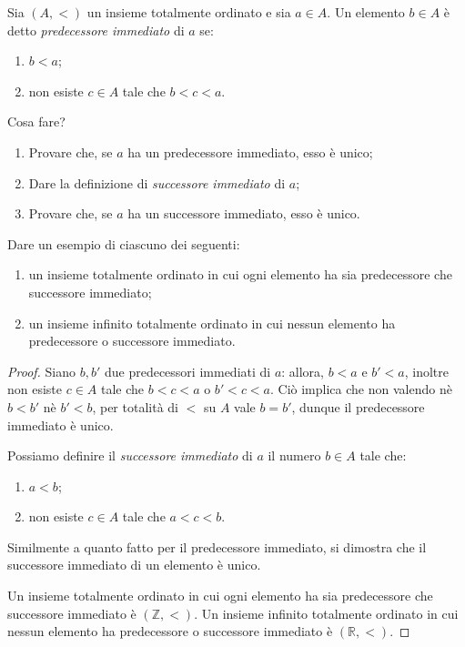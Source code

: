 \begin{exe}
  Sia \((A,<)\) un insieme totalmente ordinato e sia \(a \in A\). Un elemento \(b \in A\) è detto \emph{predecessore immediato} di \(a\) se:
  \begin{enumerate}
    \item \(b < a\);
    \item non esiste \(c \in A\) tale che \(b < c < a\).
  \end{enumerate}
  Cosa fare?
  \begin{enumerate}
    \item Provare che, se \(a\) ha un predecessore immediato, esso è unico;
    \item Dare la definizione di \emph{successore immediato} di \(a\);
    \item Provare che, se \(a\) ha un successore immediato, esso è unico.
  \end{enumerate}
  Dare un esempio di ciascuno dei seguenti:
  \begin{enumerate}
    \item un insieme totalmente ordinato in cui ogni elemento ha sia predecessore che successore immediato;
    \item un insieme infinito totalmente ordinato in cui nessun elemento ha predecessore o successore immediato.
  \end{enumerate}
\end{exe}
\begin{proof}
  Siano \(b,b'\) due predecessori immediati di \(a\): allora, \(b < a\) e \(b' < a\), inoltre non esiste \(c \in A\) tale che \(b < c < a\) o \(b' < c < a\). Ciò implica che non valendo nè \(b < b'\) nè \(b' < b\), per totalità di \(<\) su \(A\) vale \(b = b'\), dunque il predecessore immediato è unico.

  Possiamo definire il \emph{successore immediato} di \(a\) il numero \(b \in A\) tale che:
  \begin{enumerate}
    \item \(a < b\);
    \item non esiste \(c \in A\) tale che \(a < c < b\).
  \end{enumerate}
  Similmente a quanto fatto per il predecessore immediato, si dimostra che il successore immediato di un elemento è unico.

  Un insieme totalmente ordinato in cui ogni elemento ha sia predecessore che successore immediato è \((\mathbb{Z},<)\). Un insieme infinito totalmente ordinato in cui nessun elemento ha predecessore o successore immediato è \((\mathbb{R},<)\).
\end{proof}

